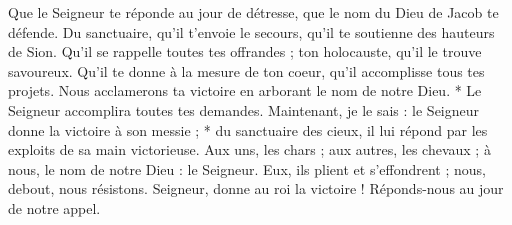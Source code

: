 Que le Seigneur te réponde au jour de détresse, que le nom du Dieu de Jacob te défende.
\versseparator
Du sanctuaire, qu'il t'envoie le secours, qu'il te soutienne des hauteurs de Sion.
\versseparator
Qu'il se rappelle toutes tes offrandes ; ton holocauste, qu'il le trouve savoureux.
\versseparator
Qu'il te donne à la mesure de ton coeur, qu'il accomplisse tous tes projets.
\versseparator
Nous acclamerons ta victoire en arborant le nom de notre Dieu. * Le Seigneur accomplira toutes tes demandes.
\versseparator
Maintenant, je le sais : le Seigneur donne la victoire à son messie ; * du sanctuaire des cieux, il lui répond par les exploits de sa main victorieuse.
\versseparator
Aux uns, les chars ; aux autres, les chevaux ; à nous, le nom de notre Dieu : le Seigneur.
\versseparator
Eux, ils plient et s'effondrent ; nous, debout, nous résistons.
\versseparator
Seigneur, donne au roi la victoire ! Réponds-nous au jour de notre appel.
